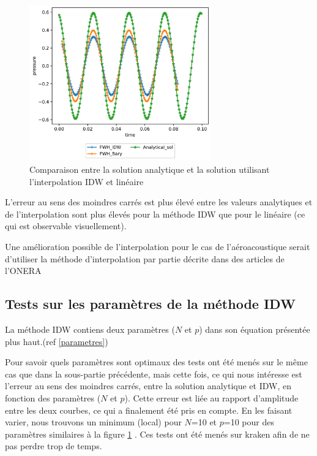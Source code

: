 \begin{figure}[H]
    \centering
    \includegraphics[width=0.70\textwidth]{images/onde_aac.png}
    \caption{Comparaison entre la solution analytique et la solution utilisant l'interpolation IDW et linéaire}
    \label{fig:onde_aac}
\end{figure}

L'erreur au sens des moindres carrés est plus élevé entre les valeurs analytiques et de l'interpolation sont plus élevés pour la méthode IDW que pour le linéaire (ce qui est observable visuellement).


Une amélioration possible de l'interpolation pour le cas de l'aéroacoustique serait d'utiliser la méthode d'interpolation par partie décrite dans des articles de l’ONERA\cite{cunha2011}\cite{cunha2016}

\subsection{Tests sur les paramètres de la méthode IDW}

La méthode IDW contiens deux paramètres (\(N\) et \(p\)) dans son équation présentée plus haut.(ref \ref{parametres})

Pour savoir quels paramètres sont optimaux des tests ont été menés sur le même cas que dans la sous-partie précédente, mais cette fois, ce qui nous intéresse est l'erreur au sens des moindres carrés, entre la solution analytique et IDW, en fonction des paramètres (\(N\) et \(p\)). Cette erreur est liée au rapport d'amplitude entre les deux courbes, ce qui a finalement été pris en compte. En les faisant varier, nous trouvons un minimum (local) pour \(N\)=10 et \(p\)=10 pour des paramètres similaires à la figure \ref{fig:onde_aac} .
Ces tests ont été menés sur kraken afin de ne pas perdre trop de temps.

